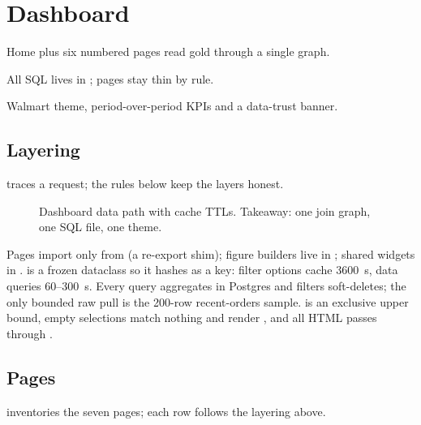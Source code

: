 \chapter{Dashboard}

\begin{glance}
\item Home plus six numbered pages read gold through a single  graph.
\item All SQL lives in ; pages stay thin by rule.
\item Walmart theme, period-over-period KPIs and a data-trust banner.
\end{glance}

\section{Layering}

 traces a request; the rules below keep the layers honest.

\begin{figure}[tbp]
\centering

\caption{Dashboard data path with cache TTLs. Takeaway: one join graph, one SQL file, one theme.}
\label{fig:dashboard-arch}
\end{figure}

Pages import only from  (a re-export shim); figure builders live in ; shared widgets in .  is a frozen dataclass so it hashes as a  key: filter options cache 3600~s, data queries 60--300~s. Every query aggregates in Postgres and filters soft-deletes; the only bounded raw pull is the 200-row recent-orders sample.  is an exclusive upper bound, empty selections match nothing and render , and all HTML passes through .

\section{Pages}

 inventories the seven pages; each row follows the layering above.

